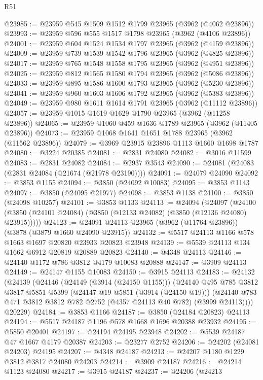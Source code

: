 \begin{lexlean}{R51}
\begin{coremodule}
@23985 := @23959 @545 @1509 @1512 @1799 @23965 (@3962 (@4062 @23896))
@23993 := @23959 @596 @555 @1517 @1798 @23965 (@3962 (@4106 @23896))
@24001 := @23959 @604 @1524 @1534 @1797 @23965 (@3962 (@4159 @23896))
@24009 := @23959 @739 @1539 @1542 @1796 @23965 (@3962 (@4825 @23896))
@24017 := @23959 @765 @1548 @1558 @1795 @23965 (@3962 (@4951 @23896))
@24025 := @23959 @812 @1565 @1580 @1794 @23965 (@3962 (@5086 @23896))
@24033 := @23959 @895 @1586 @1600 @1793 @23965 (@3962 (@5230 @23896))
@24041 := @23959 @960 @1603 @1606 @1792 @23965 (@3962 (@5383 @23896))
@24049 := @23959 @980 @1611 @1614 @1791 @23965 (@3962 (@11112 @23896))
@24057 := @23959 @1015 @1619 @1629 @1790 @23965 (@3962 (@11258 @23896))
@24065 := @23959 @1060 @459 @1636 @1789 @23965 (@3962 (@11405 @23896))
@24073 := @23959 @1068 @1641 @1651 @1788 @23965 (@3962 (@11562 @23896))
@24079 := @3969 @23915 @23896 @1113 @1660 @1698 @1787
@24080 := @3224 @20385
@24081 := @2831 @24080
@24082 := @3016 @11599
@24083 := @2831 @24082
@24084 := @2937 @3543
@24090 := @24081 (@24083 (@2831 @24084 (@21674 (@21978 @23190))))
@24091 := @24079 @24090
@24092 := @3853 @1155
@24094 := @3850 (@24092 @10083)
@24095 := @3853 @1143
@24097 := @3850 (@24095 @21977)
@24098 := @3853 @1138
@24100 := @3850 (@24098 @10257)
@24101 := @3853 @1133
@24113 := @24094
    (@24097 (@24100 (@3850 (@24101 @24084) (@3850 (@12133 @24082) (@3850 (@12136 @24080) @23915)))))
@24123 := @24091 @24113 @23965 (@3962 (@11764 @23896)) (@3878 (@3879 @1660 @24090 @23915))
@24132 := @5517 @24113 @1166 @578 @1663 @1697 @20820 @23933 @20823 @23948
@24139 := @5539 @24113 @134 @1662 @6912 @20819 @20889 @20823
@24140 := @4348 @24113
@24146 := @24140 @1172 @786 @3812 @4179 @10083 @20888
@24147 := @3909 @24113
@24149 := @24147 @1155 @10083
@24150 := @3915 @24113
@24183 := @24132
    (@24139
      (@24146
        (@24149 (@3914 (@24150 @1155)))
        (@24140
          @495
          @785
          @3812
          @3817
          @5851
          @5399
          (@24147 @19 @5851 (@3914 (@24150 @19)))
          (@24140 @783 @471 @3812 @3812 @782 @2752 (@4357 @24113 @40 @782) (@3999 @24113))))
      @20229)
@24184 := @3853 @1166
@24187 := @3850 (@24184 @20823) @24113
@24194 := @5517 @24187 @1196 @578 @1668 @1696 @20388 @23932
@24195 := @5850 @20401
@24197 := @24194 @24195 @23948
@24202 := @5539 @24187 @47 @1667 @4179 @20387
@24203 := @23277 @2752
@24206 := @24202 (@24081 @24203) @24195
@24207 := @4348 @24187
@24213 := @24207 @1180 @1229 @3812 @3817 @24080 @24203
@24214 := @3909 @24187
@24216 := @24214 @1123 @24080
@24217 := @3915 @24187
@24237 := @24206
    (@24213

\end{coremodule}
\end{lexlean}
